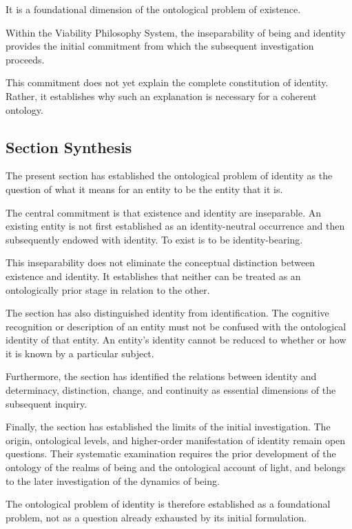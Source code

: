 It is a foundational dimension of the ontological
problem of existence.

Within the Viability Philosophy System, the
inseparability of being and identity provides the
initial commitment from which the subsequent
investigation proceeds.

This commitment does not yet explain the complete
constitution of identity. Rather, it establishes
why such an explanation is necessary for a coherent
ontology.



\subsection{Section Synthesis}
\label{subsec:ontological-problem-section-synthesis}

The present section has established the ontological
problem of identity as the question of what it means
for an entity to be the entity that it is.

The central commitment is that existence and identity
are inseparable. An existing entity is not first
established as an identity-neutral occurrence and
then subsequently endowed with identity. To exist
is to be identity-bearing.

This inseparability does not eliminate the conceptual
distinction between existence and identity. It
establishes that neither can be treated as an
ontologically prior stage in relation to the other.

The section has also distinguished identity from
identification. The cognitive recognition or
description of an entity must not be confused with
the ontological identity of that entity. An entity's
identity cannot be reduced to whether or how it is
known by a particular subject.

Furthermore, the section has identified the relations
between identity and determinacy, distinction, change,
and continuity as essential dimensions of the
subsequent inquiry.

Finally, the section has established the limits of
the initial investigation. The origin, ontological
levels, and higher-order manifestation of identity
remain open questions. Their systematic examination
requires the prior development of the ontology of
the realms of being and the ontological account of
light, and belongs to the later investigation of
the dynamics of being.

The ontological problem of identity is therefore
established as a foundational problem, not as a
question already exhausted by its initial
formulation.


